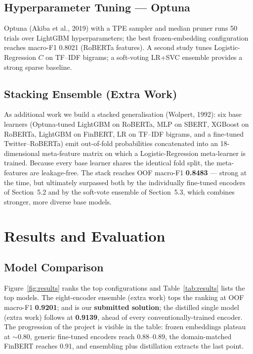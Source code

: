 \documentclass[11pt,a4paper]{article}
\newcommand{\distf}{0.9139}    %
\begin{document}
\subsection{Hyperparameter Tuning --- Optuna}
Optuna (Akiba et al., 2019) with a TPE sampler and median pruner runs 50 trials over LightGBM
hyperparameters; the best frozen-embedding configuration reaches macro-F1 0.8021 (RoBERTa features).
A second study tunes Logistic-Regression $C$ on TF--IDF bigrams; a soft-voting LR+SVC ensemble
provides a strong sparse baseline.

\subsection{Stacking Ensemble (Extra Work)}
As additional work we build a stacked generalisation (Wolpert, 1992): six base learners
(Optuna-tuned LightGBM on RoBERTa, MLP on SBERT, XGBoost on RoBERTa, LightGBM on FinBERT, LR on
TF--IDF bigrams, and a fine-tuned Twitter--RoBERTa) emit out-of-fold probabilities concatenated into
an 18-dimensional meta-feature matrix on which a Logistic-Regression meta-learner is trained. Because
every base learner shares the identical fold split, the meta-features are leakage-free. The stack
reaches OOF macro-F1 \textbf{0.8483} --- strong at the time, but ultimately surpassed both by the
individually fine-tuned encoders of Section~5.2 and by the soft-vote ensemble of Section~5.3, which
combines stronger, more diverse base models.

\section{Results and Evaluation}

\subsection{Model Comparison}
Figure~\ref{fig:results} ranks the top configurations and Table~\ref{tab:results} lists the top
models. The eight-encoder ensemble (extra work) tops the ranking at OOF macro-F1 \textbf{0.9201};
and is our \textbf{submitted solution}; the distilled single model (extra work) follows at
\textbf{\distf}, ahead of every conventionally-trained encoder. The progression of the project is
visible in the table: frozen embeddings plateau at $\sim$0.80, generic fine-tuned encoders reach
0.88--0.89, the domain-matched FinBERT reaches 0.91, and ensembling plus distillation extracts the
last point.
\end{document}
